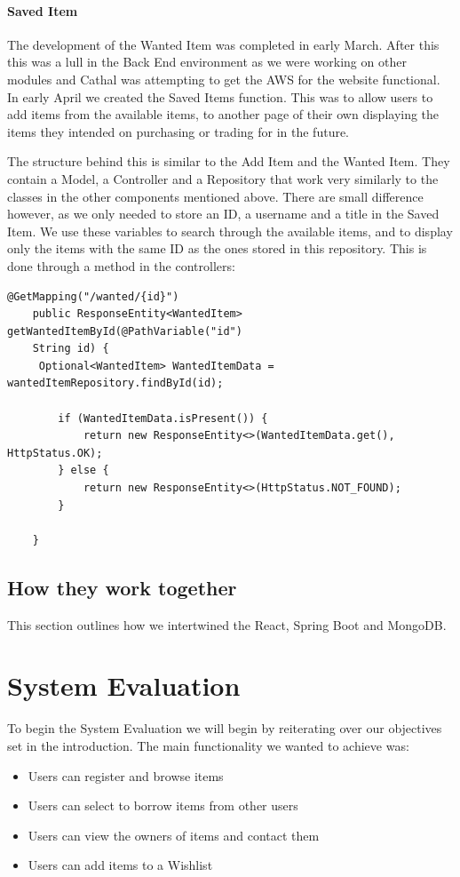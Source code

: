 \subsubsection{Saved Item}
The development of the Wanted Item was completed in early March. After this this was a lull in the Back End environment as we were working on other modules and Cathal was attempting to get the AWS for the website functional. In early April we created the Saved Items function. This was to allow users to add items from the available items, to another page of their own displaying the items they intended on purchasing or trading for in the future. \par
The structure behind this is similar to the Add Item and the Wanted Item. They contain a Model, a Controller and a Repository that work very similarly to the classes in the other components mentioned above. There are small difference however, as we only needed to store an ID, a username and a title in the Saved Item. We use these variables to search through the available items, and to display only the items with the same ID as the ones stored in this repository. This is done through a method in the controllers: \par
\begin{verbatim}
@GetMapping("/wanted/{id}")
    public ResponseEntity<WantedItem> getWantedItemById(@PathVariable("id")
    String id) {
     Optional<WantedItem> WantedItemData = wantedItemRepository.findById(id);

        if (WantedItemData.isPresent()) {
            return new ResponseEntity<>(WantedItemData.get(), HttpStatus.OK);
        } else {
            return new ResponseEntity<>(HttpStatus.NOT_FOUND);
        }

    }
\end{verbatim}
\section{How they work together}
This section outlines how we intertwined the React, Spring Boot and MongoDB.



\chapter{System Evaluation}
To begin the System Evaluation we will begin by reiterating over our objectives set in the introduction. The main functionality we wanted to achieve was:
\begin{itemize}
    \item Users can register and browse items

    \item Users can select to borrow items from other users

    \item Users can view the owners of items and contact them

    \item Users can add items to a Wishlist
\end{itemize}

